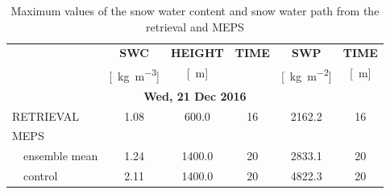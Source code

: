 \begin{table}[h!]
	\begin{center}
		\caption{Maximum values of the snow water content and snow water path from the retrieval and MEPS}\label{tab:max_val}
		\begin{tabular}{ll|c|c|c||c|c} 
			\hline \hline
			& & \textbf{SWC}  & \textbf{HEIGHT}  & \textbf{TIME} & \textbf{SWP}    & \textbf{TIME}  \\
			& & [\SI{}{\kg\per\cubic\meter}] & [\SI{}{\meter}] &  & [\SI{}{\kg\per\square\metre}] & [\SI{}{\meter}]    \\
			\hline \hline
			\multicolumn{7}{c}{\textbf{Wed, 21 Dec 2016}} \\ \hline
			\multicolumn{2}{l|}{RETRIEVAL} & 1.08 & 600.0 & \SI{16}{\UTC} & \num{2162.2} & \SI{16}{\UTC} \\
			\multicolumn{2}{l|}{MEPS} &  &  & & &  \\
			& ensemble mean & \num{1.24} & \num{1400.0} & \SI{20}{\UTC} & \num{2833.1} &  \SI{20}{\UTC}\\
			& control & \num{2.11} & \num{1400.0} & \SI{20}{\UTC} & \num{4822.3} & \SI{20}{\UTC}\\ \hline \hline

\end{tabular}
\end{center}
\end{table}
